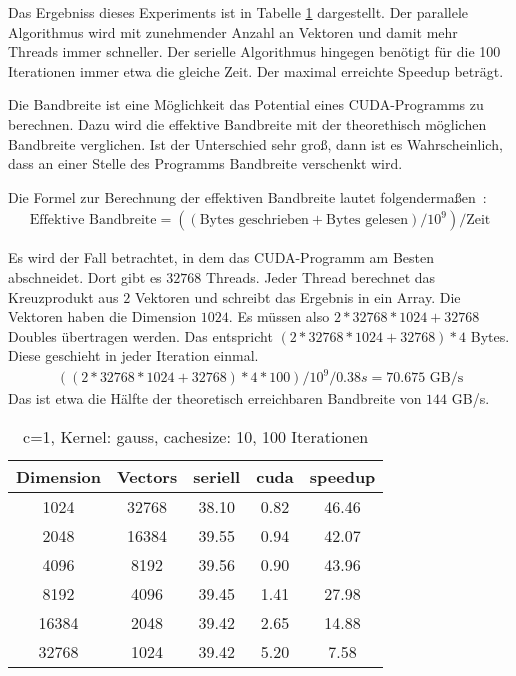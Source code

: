 \documentclass[ngerman]{scrartcl}
\begin{document}
Das Ergebniss dieses Experiments ist in Tabelle \ref{tbl:ratio-gauss-10} dargestellt. Der parallele Algorithmus wird mit zunehmender Anzahl an Vektoren und damit mehr Threads immer schneller. Der serielle Algorithmus hingegen benötigt für die 100 Iterationen immer etwa die gleiche Zeit. Der maximal erreichte Speedup beträgt.


Die Bandbreite ist eine Möglichkeit das Potential eines CUDA-Programms zu berechnen. Dazu wird die effektive Bandbreite mit der theorethisch möglichen Bandbreite verglichen.
Ist der Unterschied sehr groß, dann ist es Wahrscheinlich, dass an einer Stelle des Programms Bandbreite verschenkt wird.

Die Formel zur Berechnung der effektiven Bandbreite lautet folgendermaßen~\cite{cudabestpracticeguide}:
\begin{align}
\text{Effektive Bandbreite} = (( \text{Bytes geschrieben} + \text{Bytes gelesen} ) / 10^9 ) / \text{Zeit}
\end{align}

Es wird der Fall betrachtet, in dem das CUDA-Programm am Besten abschneidet. 
Dort gibt es $ 32768$ Threads. Jeder Thread berechnet das Kreuzprodukt aus $2$ Vektoren und schreibt das Ergebnis in ein Array. Die Vektoren haben die Dimension $1024$. Es müssen also $2 * 32768 * 1024 + 32768$ Doubles übertragen werden. Das entspricht $(2 * 32768 * 1024 + 32768) * 4$ Bytes. Diese geschieht in jeder Iteration einmal. 
\begin{align}
((2 * 32768 * 1024 + 32768) * 4 * 100) / 10^9 / 0.38s = 70.675 \text{ GB/s}
\end{align}
Das ist etwa die Hälfte der theoretisch erreichbaren Bandbreite von $144$ GB/s.

\begin{table}
\begin{center}
\begin{tabular}{|c|c|c|c|c|}
\hline
Dimension & Vectors & seriell & cuda & speedup \\
\hline
1024 & 32768 & 38.10 & 0.82 & 46.46 \\
2048 & 16384 & 39.55 & 0.94 & 42.07 \\
4096 & 8192 & 39.56 & 0.90 & 43.96 \\
8192 & 4096 & 39.45 & 1.41 & 27.98 \\
16384 & 2048 & 39.42 & 2.65 & 14.88 \\
32768 & 1024 & 39.42 & 5.20 & 7.58 \\
\hline
\end{tabular}
\end{center}
\caption{ c=1, Kernel: gauss, cachesize: 10, 100 Iterationen}
\label{tbl:ratio-gauss-10}
\end{table}
\end{document}
